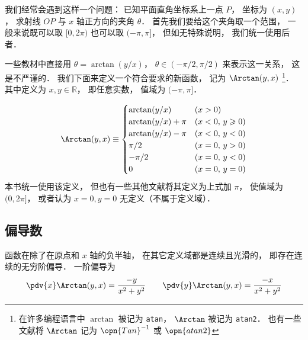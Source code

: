 
我们经常会遇到这样一个问题： 已知平面直角坐标系上一点 $P$， 坐标为 $(x, y)$， 求射线 $OP$ 与 $x$ 轴正方向的夹角 $\theta$．%
首先我们要给这个夹角取一个范围， 一般来说既可以取 $[0, 2\pi)$ 也可以取 $(-\pi, \pi]$， 但如无特殊说明， 我们统一使用后者．

一些教材中直接用 $\theta = \arctan(y/x)$， $\theta \in (-\pi/2, \pi/2)$ 来表示这一关系， 这是不严谨的． 我们下面来定义一个符合要求的新函数， 记为 $\Arctan(y, x)$ \footnote{在许多编程语言中 $\arctan$ 被记为 \lstinline|atan|， $\Arctan$ 被记为 \lstinline|atan2|． 也有一些文献将 $\Arctan$ 记为 $\opn{Tan}^{-1}$ 或 $\opn{atan2}$}． 其中定义为 $x, y \in \mathbb R$， 即任意实数， 值域为 $(-\pi, \pi]$．

\begin{equation}\label{Arctan_eq1}
\Arctan(y,x) \equiv 
\begin{cases}
\arctan (y/x) \quad &(x > 0)\\
\arctan (y/x) + \pi  &(x < 0,\,y \geqslant 0)\\
\arctan (y/x) - \pi  &(x < 0,\,y < 0)\\
\pi /2  &(x = 0, \,y > 0)\\
 -\pi /2  &(x = 0, \,y < 0)\\
0 & (x=0,\,y=0)
\end{cases}
\end{equation}
本书统一使用该定义， 但也有一些其他文献将其定义为上式加 $\pi$， 使值域为 $(0, 2\pi]$， 或者认为 $x = 0, y = 0$ 无定义（不属于定义域）．

\subsection{偏导数}
函数在除了在原点和 $x$ 轴的负半轴， 在其它定义域都是连续且光滑的， 即存在连续的无穷阶偏导． 一阶偏导为
\begin{equation}
\pdv{x} \Arctan(y, x) = \frac{-y}{x^2 + y^2} \qquad
\pdv{y} \Arctan(y, x) = \frac{-x}{x^2 + y^2}
\end{equation}
